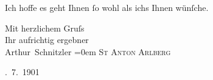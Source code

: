 \pstart
           Ich hoffe es geht Ihnen{ }ſo wohl als ichs Ihnen wünſche.\pend
           
\pstart
           Mit herzlichem Gruſs{\\[\baselineskip]}Ihr aufrichtig ergebner{\\[\baselineskip]}\spacefill\mbox{Arthur Schnitzler}\pend
           \leftskip=0em{}
\pstart
           \noindent{}\textsc{St Anton Arlberg}\pend
           
. 7. 1901\pend
           \endnumbering{}  \newcommand{\dateiname}{L04343}\newcommand{\titel}{Arthur Schnitzler an Rainer Maria Rilke, 4. 7. 1901}\newcommand{\editorInnen}{Herausgegeben von Jahnke, SelmaMüller, Martin Anton}
